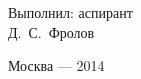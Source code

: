 \documentclass[12pt]{report}
\begin{document}

\hangindent=8cm
\vbox{\vspace{10mm}}\noindent %
Выполнил: аспирант\\
Д.~С.~Фролов \\
\vbox{\vspace{10mm}}\noindent
\vbox{\vspace{10mm}}\noindent
\vbox{\vspace{10mm}}\noindent
\vbox{\vspace{10mm}}\noindent
\vbox{\vspace{10mm}}\noindent
\vbox{\vspace{10mm}}\noindent
\vspace{\fill}

\begin{center}
\Large
Москва --- 2014
\end{center}
\end{document}

